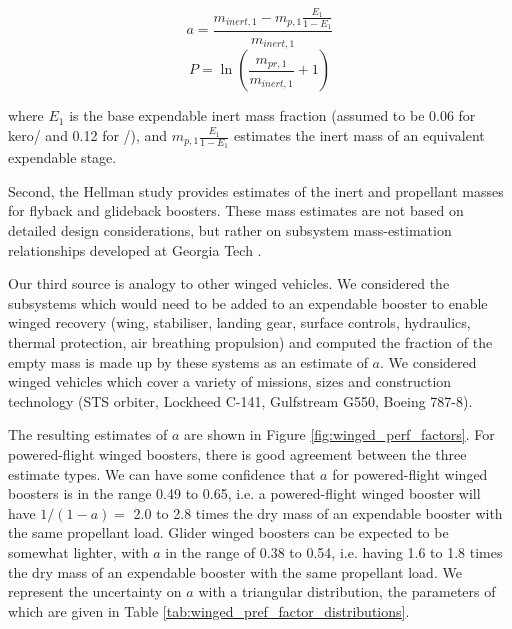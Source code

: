 \documentclass[conf]{../new-aiaa}
\begin{document}
\[
a = \frac{m_{inert,1} - m_{p,1} \frac{E_1}{1 - E_1}}{m_{inert,1}}
\]
\[
P = \ln\left( \frac{m_{pr,1}}{m_{inert,1}} + 1 \right)
\]

where $E_1$ is the base expendable inert mass fraction (assumed to be 0.06 for kero/ and 0.12 for /), and $m_{p,1} \frac{E_1}{1 - E_1}$ estimates the inert mass of an equivalent expendable stage.

Second, the Hellman study provides estimates of the inert and propellant masses for flyback and glideback boosters. These mass estimates are not based on detailed design considerations, but rather on subsystem mass-estimation relationships developed at Georgia Tech \cite{Rohrschneider2002}.

Our third source is analogy to other winged vehicles. We considered the subsystems which would need to be added to an expendable booster to enable winged recovery (wing, stabiliser, landing gear, surface controls, hydraulics, thermal protection, air breathing propulsion) and computed the fraction of the empty mass is made up by these systems as an estimate of $a$. We considered winged vehicles which cover a variety of missions, sizes and construction technology (STS orbiter, Lockheed C-141, Gulfstream G550, Boeing 787-8).

The resulting estimates of $a$ are shown in Figure \ref{fig:winged_perf_factors}. For powered-flight winged boosters, there is good agreement between the three estimate types. We can have some confidence that $a$ for powered-flight winged boosters is in the range 0.49 to 0.65, i.e. a powered-flight winged booster will have $1/(1-a) =$ 2.0 to 2.8 times the dry mass of an expendable booster with the same propellant load. Glider winged boosters can be expected to be somewhat lighter, with $a$ in the range of 0.38 to 0.54, i.e. having 1.6 to 1.8 times the dry mass of an expendable booster with the same propellant load. We represent the uncertainty on $a$ with a triangular distribution, the parameters of which are given in Table \ref{tab:winged_pref_factor_distributions}.
\end{document}
